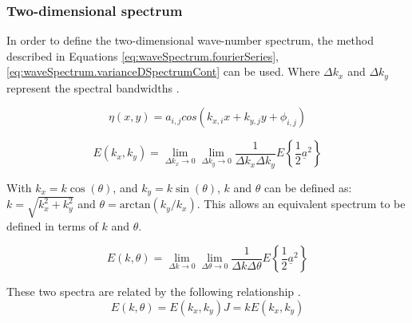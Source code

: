 

\subsubsection{Two-dimensional spectrum} \label{subsec:theory.waves.waveNumberSpectra.2D}
In order to define the two-dimensional wave-number spectrum, the method described in Equations \ref{eq:waveSpectrum.fourierSeries}, \ref{eq:waveSpectrum.varianceDSpectrumCont} can be used. Where $\Delta k_{x}$ and $\Delta k_{y}$ represent the spectral bandwidths \cite{Holthuijsen2007}.

\begin{equation} \label{eq:waveNumberSpectrum.fourierSeries_2D}
    \eta(x,y) = a_{i,j}cos(k_{x,i}x + k_{y,j}y + \phi_{i,j})
\end{equation}

\begin{equation} \label{eq:waveNumberSpectrum.SpectrumCont_2D}
    E(k_{x},k_{y}) = \lim_{\Delta k_{x} \to 0} \lim_{\Delta k_{y} \to 0} \frac{1}{\Delta k_{x} \Delta k_{y}} E\left \{ \frac{1}{2} \underline{a}^{2}\right \}
\end{equation}

With $k_{x} = k\cos(\theta)$, and $k_{y} = k\sin(\theta)$, $k$ and $\theta$ can be defined as: $k = \sqrt{k_{x}^2 + k_{y}^2}$ and $\theta = \text{arctan}(k_{y}/k_{x})$. This allows an equivalent spectrum to be defined in terms of $k$ and $\theta$.

\begin{equation} \label{eq:waveNumberSpectrum.SpectrumCont_2D_kTh}
    E(k,\theta) = \lim_{\Delta k \to 0} \lim_{\Delta \theta \to 0} \frac{1}{\Delta k \Delta \theta} E\left \{ \frac{1}{2} \underline{a}^{2}\right \}
\end{equation}

These two spectra are related by the following relationship \cite{Holthuijsen2007}.
\begin{equation} \label{eq:waveNumberSpectrum.relateE(k,th)toE(kx,ky)_2D}
    E(k,\theta) =  E(k_{x},k_{y}) J = k E(k_{x},k_{y})
\end{equation}


